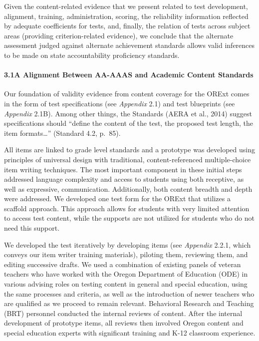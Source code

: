 \documentclass[]{article}
\let\oldparagraph\paragraph
\renewcommand{\paragraph}[1]{\oldparagraph{#1}\mbox{}}
\begin{document}
Given the content-related evidence that we present related to test
development, alignment, training, administration, scoring, the
reliability information reflected by adequate coefficients for tests,
and, finally, the relation of tests across subject areas (providing
criterion-related evidence), we conclude that the alternate assessment
judged against alternate achievement standards allows valid inferences
to be made on state accountability proficiency standards.

\paragraph{3.1A Alignment Between AA-AAAS and Academic Content
Standards}\label{a-alignment-between-aa-aaas-and-academic-content-standards}

Our foundation of validity evidence from content coverage for the ORExt
comes in the form of test specifications (see \emph{Appendix} 2.1) and
test blueprints (see \emph{Appendix} 2.1B). Among other things, the
Standards (AERA et al., 2014) suggest specifications should ``define the
content of the test, the proposed test length, the item
formats\ldots{}'' (Standard 4.2, p.~85).

All items are linked to grade level standards and a prototype was
developed using principles of universal design with traditional,
content-referenced multiple-choice item writing techniques. The most
important component in these initial steps addressed language complexity
and access to students using both receptive, as well as expressive,
communication. Additionally, both content breadth and depth were
addressed. We developed one test form for the ORExt that utilizes a
scaffold approach. This approach allows for students with very limited
attention to access test content, while the supports are not utilized
for students who do not need this support.

We developed the test iteratively by developing items (see
\emph{Appendix} 2.2.1, which conveys our item writer training
materials), piloting them, reviewing them, and editing successive
drafts. We used a combination of existing panels of veteran teachers who
have worked with the Oregon Department of Education (ODE) in various
advising roles on testing content in general and special education,
using the same processes and criteria, as well as the introduction of
newer teachers who are qualified as we proceed to remain relevant.
Behavioral Research and Teaching (BRT) personnel conducted the internal
reviews of content. After the internal development of prototype items,
all reviews then involved Oregon content and special education experts
with significant training and K-12 classroom experience.
\end{document}
